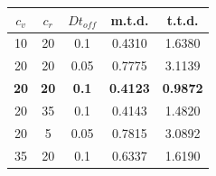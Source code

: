 \documentclass[journal]{IEEEtran}
\begin{document}
\begin{center}
\begin{tabular}{ |c|c|c|c|c| }
\hline
$c_v$ & $c_r$ & $Dt_{off}$ & m.t.d. & t.t.d.\\
\hline
10  &   20  &   0.1  & 0.4310 & 1.6380\\
20  &   20  &   0.05  & 0.7775 & 3.1139\\
\textbf{20}  &  \textbf{20}  & \textbf{0.1} & \textbf{0.4123} & \textbf{0.9872}\\
20  &   35  &   0.1  & 0.4143 & 1.4820\\
20  &   5  &  0.05  & 0.7815 & 3.0892\\
35  &   20  &   0.1  & 0.6337 & 1.6190\\
\hline
\end{tabular}
\label{tab:simulationmetricsrg}
\end{center}

%
%
%
%
\end{document}
